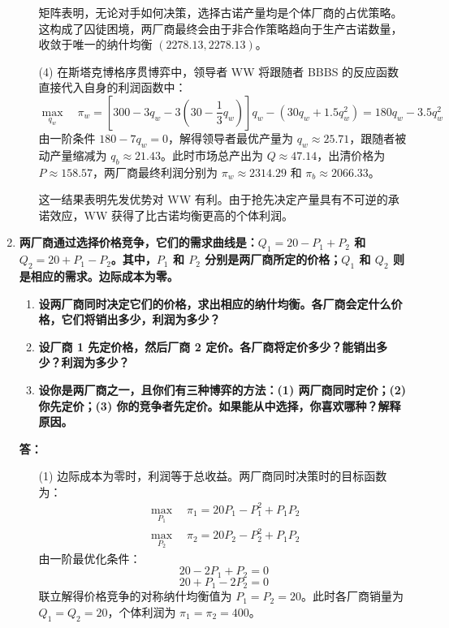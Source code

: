 \begin{enumerate}[label=\textbf{\arabic*.}, leftmargin=*]
\begin{enumerate}
			矩阵表明，无论对手如何决策，选择古诺产量均是个体厂商的占优策略。这构成了囚徒困境，两厂商最终会由于非合作策略趋向于生产古诺数量，收敛于唯一的纳什均衡 $(2278.13, 2278.13)$。
			
			\item[(4)] 在斯塔克博格序贯博弈中，领导者 WW 将跟随者 BBBS 的反应函数直接代入自身的利润函数中：
			\[ \max_{q_w} \quad \pi_w = \left[300 - 3q_w - 3\left(30 - \frac{1}{3}q_w\right)\right]q_w - (30q_w + 1.5q_w^2) = 180q_w - 3.5q_w^2 \]
			由一阶条件 $180 - 7q_w = 0$，解得领导者最优产量为 $q_w \approx 25.71$，跟随者被动产量缩减为 $q_b \approx 21.43$。此时市场总产出为 $Q \approx 47.14$，出清价格为 $P \approx 158.57$，两厂商最终利润分别为 $\pi_w \approx 2314.29$ 和 $\pi_b \approx 2066.33$。
			
			这一结果表明先发优势对 WW 有利。由于抢先决定产量具有不可逆的承诺效应，WW 获得了比古诺均衡更高的个体利润。
			\end{enumerate}
		\item \textbf{两厂商通过选择价格竞争，它们的需求曲线是：$Q_1 = 20 - P_1 + P_2$ 和 $Q_2 = 20 + P_1 - P_2$。其中，$P_1$ 和 $P_2$ 分别是两厂商所定的价格；$Q_1$ 和 $Q_2$ 则是相应的需求。边际成本为零。}
		
		\begin{enumerate}
			\item \textbf{设两厂商同时决定它们的价格，求出相应的纳什均衡。各厂商会定什么价格，它们将销出多少，利润为多少？}
			\item \textbf{设厂商 1 先定价格，然后厂商 2 定价。各厂商将定价多少？能销出多少？利润为多少？}
			\item \textbf{设你是两厂商之一，且你们有三种博弈的方法：(1) 两厂商同时定价；(2) 你先定价；(3) 你的竞争者先定价。如果能从中选择，你喜欢哪种？解释原因。}
		\end{enumerate}
		
		\textbf{答：}
		\begin{enumerate}
			\item[(1)] 边际成本为零时，利润等于总收益。两厂商同时决策时的目标函数为：
			\[
			\begin{aligned}
				\max_{P_1} \quad \pi_1 = 20P_1 - P_1^2 + P_1P_2 \\
				\max_{P_2} \quad \pi_2 = 20P_2 - P_2^2 + P_1P_2
			\end{aligned}
			\]
			由一阶最优化条件：
			\[ 20 - 2P_1 + P_2 = 0 \]
			\[ 20 + P_1 - 2P_2 = 0 \]
			联立解得价格竞争的对称纳什均衡值为 $P_1 = P_2 = 20$。此时各厂商销量为 $Q_1 = Q_2 = 20$，个体利润为 $\pi_1 = \pi_2 = 400$。
			

\end{enumerate}
\end{enumerate}
